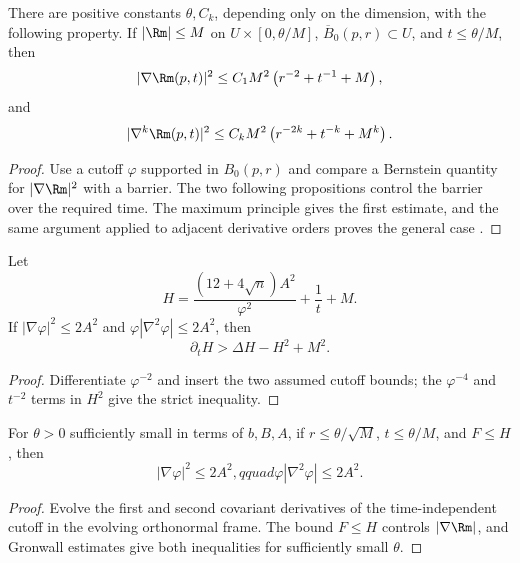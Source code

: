 \begin{theorem}
  \label{thm:cz-local-curvature-derivative-estimates}
There are positive constants $\theta,C_k$, depending only on the
dimension, with the following property.  If $|\Rm|\le M$ on
$U\times[0,\theta/M]$, $\overline B_0(p,r)\subset U$, and
$t\le\theta/M$, then
\[
|\nabla\Rm(p,t)|^2\le C_1M^2\left(r^{-2}+t^{-1}+M\right),
\]
and
\[
|\nabla^k\Rm(p,t)|^2\le C_kM^2\left(r^{-2k}+t^{-k}+M^k\right).
\]
\end{theorem}
\begin{proof}
\sketch Use a cutoff $\varphi$ supported in $B_0(p,r)$ and compare
a Bernstein quantity for $|\nabla\Rm|^2$ with a barrier.  The two
following propositions control the barrier over the required time.
The maximum principle gives the first estimate, and the same argument
applied to adjacent derivative orders proves the general case \cite{Sh89, Ha95F}.
\end{proof}

\begin{proposition}
  \label{prop:cz-cutoff-barrier-is-a-strict-supersolution}
Let
\[
H=\frac{(12+4\sqrt n)A^2}{\varphi^2}+\frac1t+M.
\]
If $|\nabla\varphi|^2\le2A^2$ and
$\varphi|\nabla^2\varphi|\le2A^2$, then
\[
\partial_tH>\Delta H-H^2+M^2.
\]
\end{proposition}
\begin{proof}
\sketch Differentiate $\varphi^{-2}$ and insert the two assumed
cutoff bounds; the $\varphi^{-4}$ and $t^{-2}$ terms in $H^2$ give
the strict inequality.
\end{proof}

\begin{proposition}
  \label{prop:cz-short-time-control-of-cutoff-derivatives}
For $\theta>0$ sufficiently small in terms of $b,B,A$, if
$r\le\theta/\sqrt M$, $t\le\theta/M$, and $F\le H$, then
\[
|\nabla\varphi|^2\le2A^2,qquad
\varphi|\nabla^2\varphi|\le2A^2.
\]
\end{proposition}
\begin{proof}
\sketch Evolve the first and second covariant derivatives of the
time-independent cutoff in the evolving orthonormal frame.  The bound
$F\le H$ controls $|\nabla\Rm|$, and Gronwall estimates give both
inequalities for sufficiently small $\theta$.
\end{proof}

